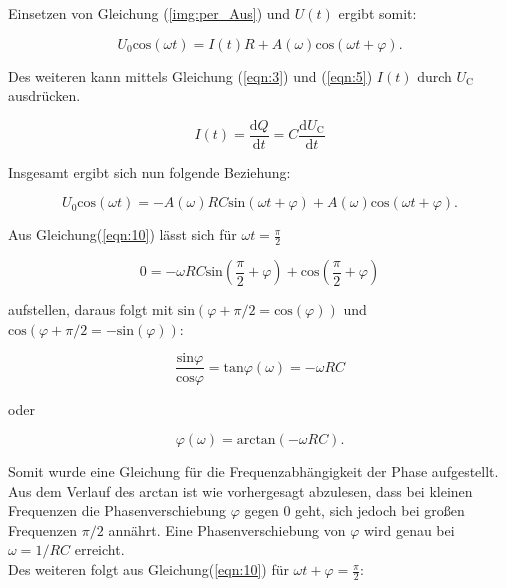         \noindent Einsetzen von Gleichung (\ref{img:per_Aus}) und $U(t)$ ergibt somit:

        \begin{equation*}
            U_0 \text{cos}(\omega t) = I(t)R + A(\omega) \text{cos}(\omega t + \varphi) .
        \end{equation*}

        \noindent Des weiteren kann mittels Gleichung (\ref{eqn:3}) und (\ref{eqn:5}) $I(t)$ durch $U_{\text{C}}$ ausdrücken.

        \begin{equation}
            I(t) = \frac{\text{d}Q}{\text{d}t} = C \frac{\text{d}U_\text{C}}{\text{d}t}
            \label{eqn:9}
        \end{equation}

        \noindent Insgesamt ergibt sich nun folgende Beziehung:

        \begin{equation}
            U_0 \text{cos}(\omega t) = -A(\omega) R C \text{sin}(\omega t + \varphi) + A(\omega) \text{cos}(\omega t + \varphi) .
            \label{eqn:10}
        \end{equation}

        \noindent Aus Gleichung(\ref{eqn:10}) lässt sich für $\omega t = \frac{\pi}{2}$ 

        \begin{equation*}
            0 = -\omega R C \text{sin} \left( \frac{\pi}{2} + \varphi \right) + \text{cos} \left( \frac{\pi}{2} + \varphi \right)
        \end{equation*}

        \noindent aufstellen, daraus folgt mit $\text{sin}(\varphi + \pi /2 = \text{cos}(\varphi))$ und $\text{cos}(\varphi + \pi/2 = - \text{sin}
        (\varphi))$:

        \begin{equation*}
            \frac{\text{sin} \varphi}{\text{cos} \varphi} = \text{tan} \varphi (\omega) = -\omega RC 
        \end{equation*}

        \noindent oder

        \begin{equation}
            \varphi (\omega) = \text{arctan} ( - \omega R C) .
            \label{eqn:11}
        \end{equation}

        \noindent Somit wurde eine Gleichung für die Frequenzabhängigkeit der Phase aufgestellt. Aus dem Verlauf des arctan ist wie vorhergesagt 
        abzulesen, dass bei kleinen Frequenzen die Phasenverschiebung $\varphi$ gegen 0 geht, sich jedoch bei großen Frequenzen $\pi/2$ annährt.
        Eine Phasenverschiebung von $\varphi$ wird genau bei $\omega = 1/RC$ erreicht.\\
        Des weiteren folgt aus Gleichung(\ref{eqn:10}) für $\omega t + \varphi = \frac{\pi}{2}$:


